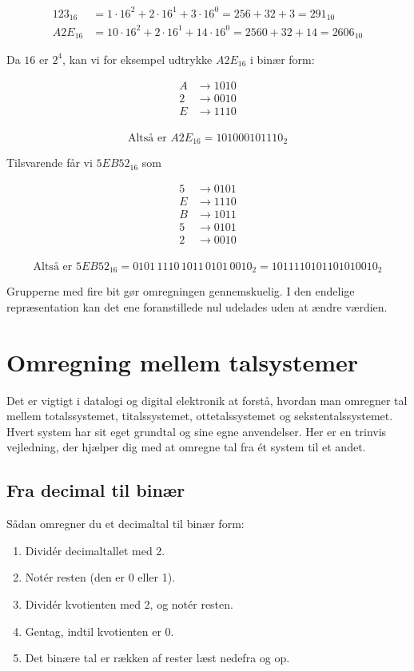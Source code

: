 \[
\begin{aligned}
123_{16} &= 1 \cdot 16^2 + 2 \cdot 16^1 + 3 \cdot 16^0  = 256 + 32 + 3 = 291_{10} \\
A2E_{16} & = 10 \cdot 16^2 + 2 \cdot 16^1 + 14 \cdot 16^0 = 2560 + 32 + 14 = 2606_{10}
\end{aligned}
\]

Da \(16\) er \(2^4\), kan vi for eksempel udtrykke $A2E_{16}$ i binær form:

\[
\begin{aligned}
A & \rightarrow 1010 \\
2 & \rightarrow 0010 \\
E & \rightarrow 1110 \\
\end{aligned}
\]

\[
\text{Altså er } A2E_{16} = 101000101110_2
\]

Tilsvarende får vi $5EB52_{16}$ som

\[
\begin{aligned}
5 & \rightarrow 0101 \\
E & \rightarrow 1110 \\
B & \rightarrow 1011 \\
5 & \rightarrow 0101 \\
2 & \rightarrow 0010 \\
\end{aligned}
\]

\[
\text{Altså er } 5EB52_{16} = 0101\,1110\,1011\,0101\,0010_2 = 1011110101101010010_2
\]

Grupperne med fire bit gør omregningen gennemskuelig. I den endelige repræsentation kan det ene foranstillede nul udelades uden at ændre værdien.

\section{Omregning mellem talsystemer}

Det er vigtigt i datalogi og digital elektronik at forstå, hvordan man omregner tal mellem totalssystemet, titalssystemet, ottetalssystemet og sekstentalssystemet. Hvert system har sit eget grundtal og sine egne anvendelser. Her er en trinvis vejledning, der hjælper dig med at omregne tal fra ét system til et andet.

\subsection*{Fra decimal til binær}
Sådan omregner du et decimaltal til binær form:
\begin{enumerate}
    \item Dividér decimaltallet med 2.
    \item Notér resten (den er 0 eller 1).
    \item Dividér kvotienten med 2, og notér resten.
    \item Gentag, indtil kvotienten er 0.
    \item Det binære tal er rækken af rester læst nedefra og op.
\end{enumerate}

